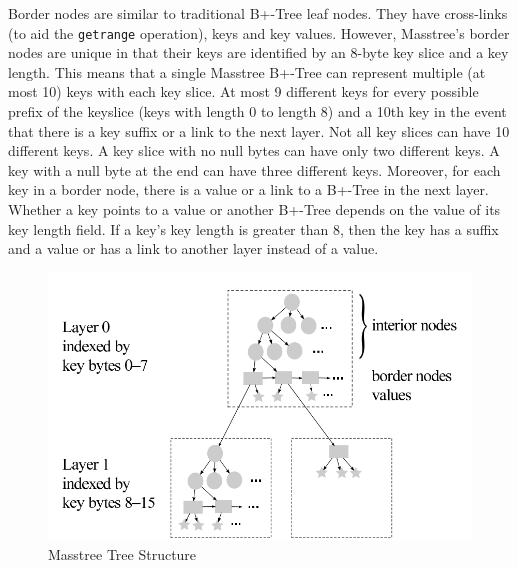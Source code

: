 Border nodes are similar to traditional B+-Tree leaf nodes. They have cross-links (to aid the \texttt{getrange} operation), keys and key values. However, Masstree's border nodes are unique in that their keys are identified by an 8-byte key slice and a key length. This means that a single Masstree B+-Tree can represent multiple (at most 10) keys with each key slice. At most 9 different keys for every possible prefix of the keyslice (keys with length 0 to length 8) and a 10th key in the event that there is a key suffix or a link to the next layer. Not all key slices can have 10 different keys. A key slice with no null bytes can have only two different keys. A key with a null byte at the end can have three different keys. Moreover, for each key in a border node, there is a value or a link to a B+-Tree in the next layer. Whether a key points to a value or another B+-Tree depends on the value of its key length field. If a key's key length is greater than 8, then the key has a suffix and a value or has a link to another layer instead of a value. 

\begin{figure}[hbtp]
    \centering
    \includegraphics[scale=0.50]{figures/masstreedatastructure.png}
    \caption{Masstree Tree Structure \cite{masstree}}
    \label{fig:MasstreeTreeStructure}
\end{figure}

